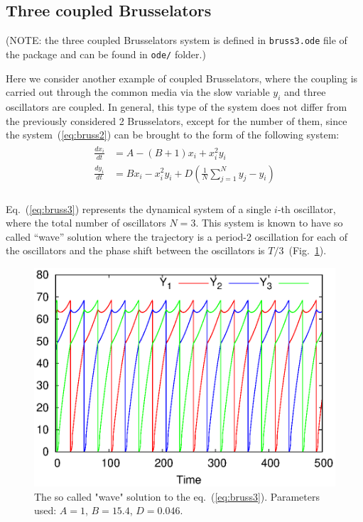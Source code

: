 \documentclass[11pt,a4paper]{article}
\begin{document}
\subsection{Three coupled Brusselators}
\label{sec:three-coupl-bruss}

(NOTE: the three coupled Brusselators system is defined in \texttt{bruss3.ode} file
of the package and can be found in \texttt{ode/} folder.)

Here we consider another example of coupled Brusselators, where the coupling is
carried out through the common media via the slow variable $y_i$ and three
oscillators are coupled. In general, this type of the system does not differ from the
previously considered 2 Brusselators, except for the number of them, since the
system~(\ref{eq:bruss2}) can be brought to the form of the following system:
\begin{align}
  \label{eq:bruss3}
  \begin{split}
    \frac{dx_i}{dt} &= A-(B+1)x_i+x_i^2y_i \\
    \frac{dy_i}{dt} &= Bx_i-x_i^2y_i + D(\frac{1}{N}\sum\limits_{j=1}^Ny_j-y_i)\\
  \end{split}
\end{align}

Eq.~(\ref{eq:bruss3}) represents the dynamical system of a single $i$-th oscillator,
where the total number of oscillators $N=3$. This system is known to have so called
``wave'' solution where the trajectory is a period-2 oscillation for each of the
oscillators and the phase shift between the oscillators is
$T/3$~(Fig.~\ref{fig:br3_wave}).

\begin{figure}[h]
  \centering
  \includegraphics[scale=0.6]{br3_wave}
  \caption{The so called "wave" solution to the eq.~(\ref{eq:bruss3}). Parameters used:
    $A=1$, $B=15.4$, $D=0.046$.}
\label{fig:br3_wave}
\end{figure}
\end{document}
